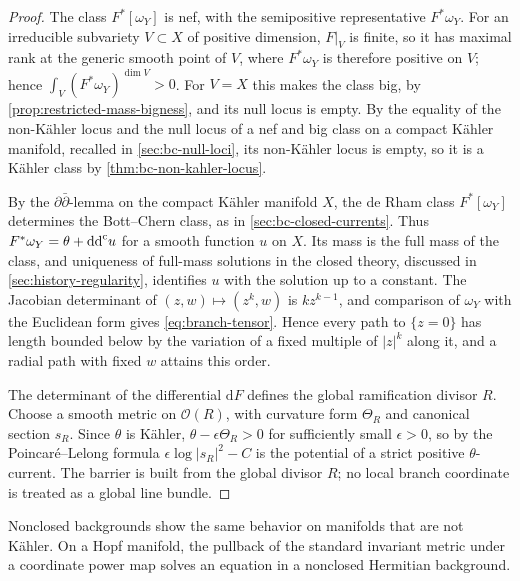 \begin{proof}
The class $F^*[\omega_Y]$ is nef, with the semipositive representative $F^*\omega_Y$. For an irreducible subvariety $V\subset X$ of positive dimension, $F|_V$ is finite, so it has maximal rank at the generic smooth point of $V$, where $F^*\omega_Y$ is therefore positive on $V$; hence $\int_V(F^*\omega_Y)^{\dim V}>0$. For $V=X$ this makes the class big, by \cref{prop:restricted-mass-bigness}, and its null locus is empty. By the equality of the non-K\"ahler locus and the null locus of a nef and big class on a compact K\"ahler manifold, recalled in \cref{sec:bc-null-loci}, its non-K\"ahler locus is empty, so it is a K\"ahler class by \cref{thm:bc-non-kahler-locus}.

By the $\partial\bar\partial$-lemma on the compact K\"ahler manifold $X$, the de Rham class $F^*[\omega_Y]$ determines the Bott--Chern class, as in \cref{sec:bc-closed-currents}. Thus $F^*\omega_Y=\theta+\mathrm{dd}^{\mathrm{c}} u$ for a smooth function $u$ on $X$. Its mass is the full mass of the class, and uniqueness of full-mass solutions in the closed theory, discussed in \cref{sec:history-regularity}, identifies $u$ with the solution up to a constant. The Jacobian determinant of $(z,w)\mapsto(z^k,w)$ is $kz^{k-1}$, and comparison of $\omega_Y$ with the Euclidean form gives \eqref{eq:branch-tensor}. Hence every path to $\{z=0\}$ has length bounded below by the variation of a fixed multiple of $|z|^k$ along it, and a radial path with fixed $w$ attains this order.

The determinant of the differential $\mathrm{d}F$ defines the global ramification divisor $R$. Choose a smooth metric on $\mathcal O(R)$, with curvature form $\Theta_R$ and canonical section $s_R$. Since $\theta$ is K\"ahler, $\theta-\epsilon\Theta_R>0$ for sufficiently small $\epsilon>0$, so by the Poincar\'e--Lelong formula $\epsilon\log|s_R|^2-C$ is the potential of a strict positive $\theta$-current. The barrier is built from the global divisor $R$; no local branch coordinate is treated as a global line bundle.
\end{proof}

Nonclosed backgrounds show the same behavior on manifolds that are not K\"ahler. On a Hopf manifold, the pullback of the standard invariant metric under a coordinate power map solves an equation in a nonclosed Hermitian background.

